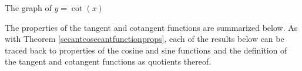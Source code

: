 \medskip

\noindent\begin{minipage}{\textwidth}
\begin{center}
\end{center}
\captionsetup{type=figure}
\caption{The graph of $y = \cot(x)$}\label{fig:cotgraph2}
\end{minipage}

\medskip


The properties of the tangent and cotangent functions are summarized below. As with Theorem \ref{secantcosecantfunctionprops}, each of the results below can be traced back to properties of the cosine and sine functions and the definition of the tangent and cotangent functions as quotients thereof. 

\smallskip

